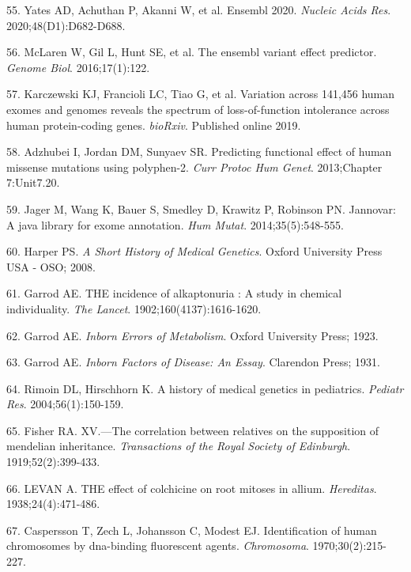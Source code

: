 \documentclass[11pt,letterpaper]{book}
\begin{document}
\leavevmode\hypertarget{ref-yates:2020aa}{}%
55. Yates AD, Achuthan P, Akanni W, et al. Ensembl 2020. \emph{Nucleic Acids Res}. 2020;48(D1):D682-D688.

\leavevmode\hypertarget{ref-mclaren:2016aa}{}%
56. McLaren W, Gil L, Hunt SE, et al. The ensembl variant effect predictor. \emph{Genome Biol}. 2016;17(1):122.

\leavevmode\hypertarget{ref-karczewski:2019aa}{}%
57. Karczewski KJ, Francioli LC, Tiao G, et al. Variation across 141,456 human exomes and genomes reveals the spectrum of loss-of-function intolerance across human protein-coding genes. \emph{bioRxiv}. Published online 2019.

\leavevmode\hypertarget{ref-adzhubei:2013aa}{}%
58. Adzhubei I, Jordan DM, Sunyaev SR. Predicting functional effect of human missense mutations using polyphen-2. \emph{Curr Protoc Hum Genet}. 2013;Chapter 7:Unit7.20.

\leavevmode\hypertarget{ref-jager:2014aa}{}%
59. Jager M, Wang K, Bauer S, Smedley D, Krawitz P, Robinson PN. Jannovar: A java library for exome annotation. \emph{Hum Mutat}. 2014;35(5):548-555.

\leavevmode\hypertarget{ref-harper:2008aa}{}%
60. Harper PS. \emph{A Short History of Medical Genetics}. Oxford University Press USA - OSO; 2008.

\leavevmode\hypertarget{ref-garrod:1902aa}{}%
61. Garrod AE. THE incidence of alkaptonuria : A study in chemical individuality. \emph{The Lancet}. 1902;160(4137):1616-1620.

\leavevmode\hypertarget{ref-garrod:1923aa}{}%
62. Garrod AE. \emph{Inborn Errors of Metabolism}. Oxford University Press; 1923.

\leavevmode\hypertarget{ref-garrod:1931aa}{}%
63. Garrod AE. \emph{Inborn Factors of Disease: An Essay}. Clarendon Press; 1931.

\leavevmode\hypertarget{ref-rimoin:2004aa}{}%
64. Rimoin DL, Hirschhorn K. A history of medical genetics in pediatrics. \emph{Pediatr Res}. 2004;56(1):150-159.

\leavevmode\hypertarget{ref-fisher:1919aa}{}%
65. Fisher RA. XV.---The correlation between relatives on the supposition of mendelian inheritance. \emph{Transactions of the Royal Society of Edinburgh}. 1919;52(2):399-433.

\leavevmode\hypertarget{ref-levan:1938aa}{}%
66. LEVAN A. THE effect of colchicine on root mitoses in allium. \emph{Hereditas}. 1938;24(4):471-486.

\leavevmode\hypertarget{ref-caspersson:1970aa}{}%
67. Caspersson T, Zech L, Johansson C, Modest EJ. Identification of human chromosomes by dna-binding fluorescent agents. \emph{Chromosoma}. 1970;30(2):215-227.
\end{document}
